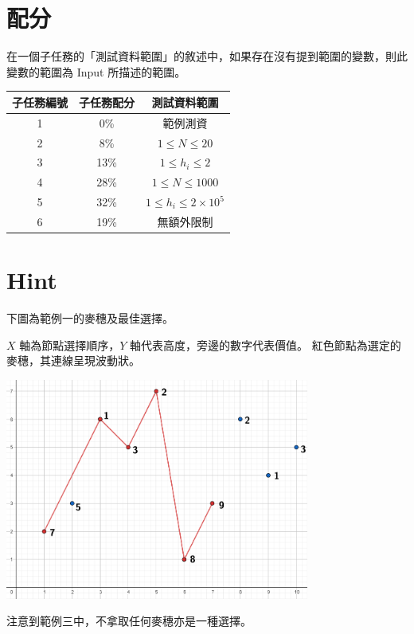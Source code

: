 \documentclass[11pt,a4paper]{article}
\begin{document}
\section*{配分}

在一個子任務的「測試資料範圍」的敘述中，如果存在沒有提到範圍的變數，則此變數的範圍為 Input 所描述的範圍。

\begin{center}
 \begin{tabular}{||c c c||} 
 \hline
 子任務編號 & 子任務配分 & 測試資料範圍 \\  
 \hline\hline
 1 & 0\% & 範例測資 \\ 
 \hline
 2 & 8\% & $1 \le N \le 20$ \\
 \hline
 3 & 13\% & $1 \le h_i \le 2$ \\
 \hline
 4 & 28\% & $1 \le N \le 1000$ \\
 \hline
 5 & 32\% & $1 \le h_i \le 2\times 10^5$ \\
 \hline
 6 & 19\% & 無額外限制 \\
 \hline
\end{tabular}
\end{center}

\section*{Hint}
下圖為範例一的麥穗及最佳選擇。

$X$ 軸為節點選擇順序，$Y$ 軸代表高度，旁邊的數字代表價值。
紅色節點為選定的麥穗，其連線呈現波動狀。
\begin{center}
	\includegraphics[width=10cm]{sample1.png}
\end{center}

注意到範例三中，不拿取任何麥穗亦是一種選擇。
\end{document}
